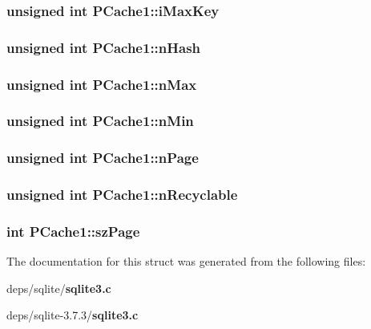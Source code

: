 \subsubsection{\setlength{\rightskip}{0pt plus 5cm}unsigned int \bf{PCache1::i\-Max\-Key}}\label{structPCache1_c111c5874fb1a7ed971eb2ee19c27130}


\subsubsection{\setlength{\rightskip}{0pt plus 5cm}unsigned int \bf{PCache1::n\-Hash}}\label{structPCache1_2417d5dc96b598e301b8690dfa046205}


\subsubsection{\setlength{\rightskip}{0pt plus 5cm}unsigned int \bf{PCache1::n\-Max}}\label{structPCache1_33e91bddbb2a18ec6fac43ad1202bc24}


\subsubsection{\setlength{\rightskip}{0pt plus 5cm}unsigned int \bf{PCache1::n\-Min}}\label{structPCache1_415a3fdcffaa0923aebf07cc4f488373}


\subsubsection{\setlength{\rightskip}{0pt plus 5cm}unsigned int \bf{PCache1::n\-Page}}\label{structPCache1_35f5032e90e9ab53bd11a68c6b0b2246}


\subsubsection{\setlength{\rightskip}{0pt plus 5cm}unsigned int \bf{PCache1::n\-Recyclable}}\label{structPCache1_02ffb713c7676defb0097c72ea7e043c}


\subsubsection{\setlength{\rightskip}{0pt plus 5cm}int \bf{PCache1::sz\-Page}}\label{structPCache1_ec1cae8132f5c0c149b1cc721446572a}




The documentation for this struct was generated from the following files:\begin{CompactItemize}
\item 
deps/sqlite/\bf{sqlite3.c}\item 
deps/sqlite-3.7.3/\bf{sqlite3.c}\end{CompactItemize}
